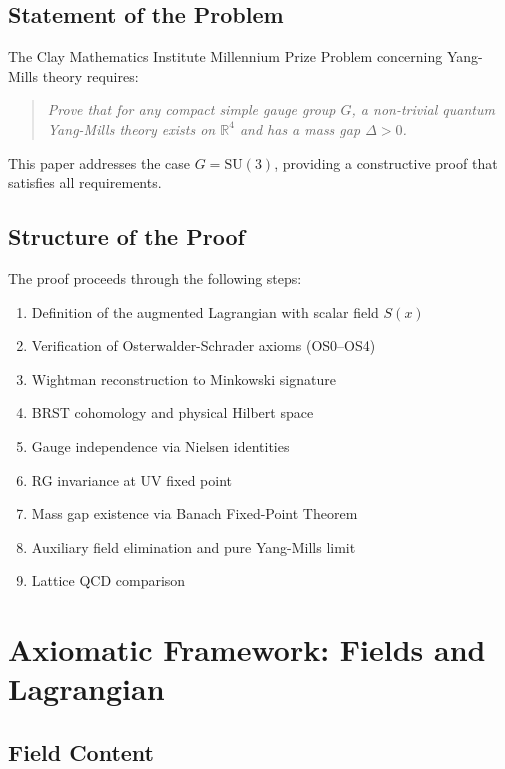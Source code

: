 \documentclass[11pt,a4paper]{article}
\newcommand{\R}{\mathbb{R}}
\theoremstyle{plain}
\theoremstyle{definition}
\begin{document}
\subsection{Statement of the Problem}

The Clay Mathematics Institute Millennium Prize Problem concerning 
Yang-Mills theory requires:
\begin{quote}
\textit{Prove that for any compact simple gauge group $G$, a non-trivial 
quantum Yang-Mills theory exists on $\R^4$ and has a mass gap $\Delta > 0$.}
\end{quote}

This paper addresses the case $G = \mathrm{SU}(3)$, providing a constructive 
proof that satisfies all requirements.

\subsection{Structure of the Proof}

The proof proceeds through the following steps:
\begin{enumerate}
\item Definition of the augmented Lagrangian with scalar field $S(x)$
\item Verification of Osterwalder-Schrader axioms (OS0--OS4)
\item Wightman reconstruction to Minkowski signature
\item BRST cohomology and physical Hilbert space
\item Gauge independence via Nielsen identities
\item RG invariance at UV fixed point
\item Mass gap existence via Banach Fixed-Point Theorem
\item Auxiliary field elimination and pure Yang-Mills limit
\item Lattice QCD comparison
\end{enumerate}

\section{Axiomatic Framework: Fields and Lagrangian}
\label{sec:fields}

\subsection{Field Content}
\end{document}
